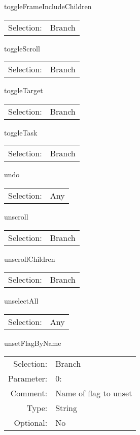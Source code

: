 \item toggleFrameIncludeChildren\\
\begin{tabular}{rl}
  Selection: & Branch\\
\end{tabular}

\item toggleScroll\\
\begin{tabular}{rl}
  Selection: & Branch\\
\end{tabular}

\item toggleTarget\\
\begin{tabular}{rl}
  Selection: & Branch\\
\end{tabular}

\item toggleTask\\
\begin{tabular}{rl}
  Selection: & Branch\\
\end{tabular}

\item undo\\
\begin{tabular}{rl}
  Selection: & Any\\
\end{tabular}

\item unscroll\\
\begin{tabular}{rl}
  Selection: & Branch\\
\end{tabular}

\item unscrollChildren\\
\begin{tabular}{rl}
  Selection: & Branch\\
\end{tabular}

\item unselectAll\\
\begin{tabular}{rl}
  Selection: & Any\\
\end{tabular}

\item unsetFlagByName\\
\begin{tabular}{rl}
  Selection: & Branch\\
   Parameter: &  0:\\
        Comment: & Name of flag to unset\\
           Type: & String\\
       Optional: &  No\\
\end{tabular}


